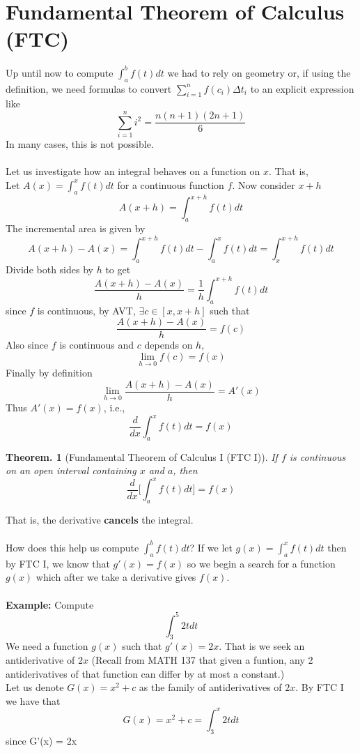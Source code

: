 \documentclass[11pt, a4paper]{memoir}
\theoremstyle{change}
\newtheorem{theorem}{Theorem.}[section]
\theoremstyle{plain}
\theoremstyle{nonumberplain}
\numberwithin{equation}{section}
\begin{document}
\section{Fundamental Theorem of Calculus (FTC)}
Up until now to compute $\int^b_af(t)dt$ we had to rely on geometry or, if using the definition, we need formulas to convert $\sum^n_{i=1}f(c_i) \Delta t_i$ to an explicit expression like $$\sum^n_{i=1}i^2 = \dfrac{n(n+1)(2n+1)}{6}$$
In many cases, this is not possible. \\ \: \\
Let us investigate how an integral behaves on a function on $x$. That is, \\
Let $A(x) = \int^x_a f(t) dt$ for a continuous function $f$. Now consider $x + h$ $$A(x+h) = \int^{x+h}_{a} f(t) dt$$
The incremental area is given by 
$$A(x+h) - A(x) = \int^{x+h}_{a}f(t) dt - \int^x_a f(t) dt = \int^{x+h}_x f(t) dt$$
Divide both sides by $h$ to get $$\dfrac{A(x+h) - A(x)}{h} = \dfrac{1}{h}\int^{x+h}_{a}f(t) dt$$
since $f$ is continuous, by AVT, $\exists c \in [x, x+h]$ such that $$\dfrac{A(x+h) - A(x)}{h} = f(c)$$
Also since $f$ is continuous and $c$ depends on $h$, $$\lim_{h \to 0} f(c) = f(x)$$
Finally by definition $$\lim_{h \to 0}\dfrac{A(x+h) - A(x)}{h} = A'(x)$$
Thus $A'(x) = f(x)$, i.e., $$\dfrac{d}{dx}\int^x_a f(t) dt = f(x)$$
\begin{theorem}[Fundamental Theorem of Calculus I (FTC I)]
  If $f$ is continuous on an open interval containing $x$ and $a$, then $$\dfrac{d}{dx}\bigg[\int^x_a f(t) dt\bigg] = f(x)$$
\end{theorem}
That is, the derivative \textbf{cancels} the integral.\\ \; \\
How does this help us compute $\int^b_a f(t) dt$? If we let $g(x) = \int^x_a f(t) dt$ then by FTC I, we know that $g'(x) = f(x)$ so we begin a search for a function $g(x)$
which after we take a derivative gives $f(x)$.
\\ \; \\
\textbf{Example:} Compute $$\int^5_3 2t dt$$
We need a function $g(x)$ such that $g'(x) = 2x$. That is we seek an antiderivative of $2x$ (Recall from MATH 137 that
given a funtion, any 2 antiderivatives of that function can differ by at most a constant.)\\
Let us denote $G(x) = x^2 + c$ as the family of antiderivatives of $2x$. By FTC I we have that 
$$G(x) = x^2 + c = \int^x_3 2t dt$$ since G'(x) = 2x \\ \: \\
\end{document}
